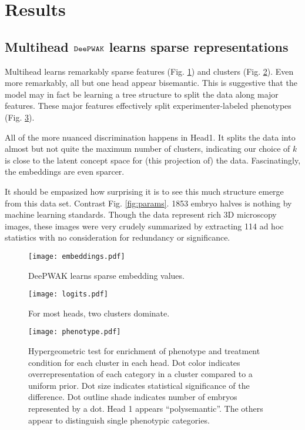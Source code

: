 \section{Results}

\subsection{Multihead $\mathop{\mathtt{DeePWAK}}\limits$ learns sparse representations}

Multihead \DeePWAK learns remarkably sparse features (Fig. \ref{fig:blockE}) and clusters (Fig. \ref{fig:blockK}). 
Even more remarkably, all but one head appear bisemantic.
This is suggestive that the model may in fact be learning a tree structure to split the data along major features. These major features effectively split experimenter-labeled phenotypes (Fig. \ref{fig:hyper}). 

All of the more nuanced discrimination happens in \textsf{Head1}.
It splits the data into almost but not quite the maximum number of clusters, indicating our choice of $k$ is close to the latent concept space for (this projection of) the data.
Fascinatingly, the embeddings are even sparcer.

It should be empasized how surprising it is to see this much structure emerge from this data set. Contrast Fig. \ref{fig:params}. 1853 embryo halves is nothing by machine learning standards.
Though the data represent rich 3D microscopy images, these images were very crudely summarized by extracting 114 ad hoc statistics with no consideration for redundancy or significance.

\begin{figure}
  \texttt{[image: embeddings.pdf]}
    \caption{DeePWAK learns sparse embedding values. }
    \label{fig:blockE}
\end{figure}

    
\begin{figure}
  \texttt{[image: logits.pdf]}
  \caption{For most heads, two clusters dominate.}
  \label{fig:blockK}
\end{figure}

\begin{figure}
  \texttt{[image: phenotype.pdf]}
  \caption{Hypergeometric test for enrichment of phenotype and treatment condition for each cluster in each head. Dot color indicates overrepresentation of each category in a cluster compared to a uniform prior. Dot size indicates statistical significance of the difference. Dot outline shade indicates number of embryos represented by a dot. Head 1 appears ``polysemantic''. The others appear to distinguish single phenotypic categories.}
  \label{fig:hyper}
\end{figure}
